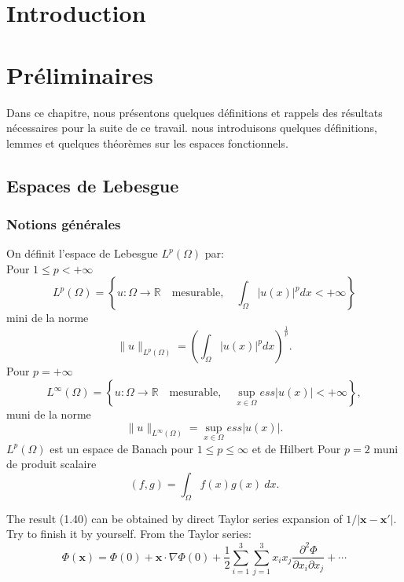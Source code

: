\documentclass[12pt,a4paper]{book}
\begin{document}
\let\cleardoublepage\clearpage
\chapter*{Introduction}
\lipsum[1-3]
\chapter{Préliminaires}
				
Dans ce chapitre, nous présentons quelques définitions et rappels des résultats nécessaires pour la suite de ce travail. nous introduisons quelques définitions, lemmes et  quelques théorèmes sur les espaces fonctionnels.
				
\section{Espaces de Lebesgue}

\subsection{Notions générales}

\begin{definition}{}{} On définit l'espace de Lebesgue $L^{p}(\Omega)$ par:\\	Pour $1\leq p <+\infty$ 
\[
L^{p}(\Omega)=\left\lbrace   u:\Omega\longrightarrow \mathbb{R}\quad \mbox{mesurable} , \quad \int_{\Omega} \lvert u(x)\rvert^{p} dx <+\infty \right\rbrace
\]
	mini de la norme 
	$$ \lVert u\rVert_{L^{p}(\Omega)}=\left(   \int_{\Omega} \lvert u(x)\rvert^{p} dx \right)      ^{\frac{1}{p}}.$$
	Pour $p=+\infty$ 
	$$ L^{\infty}(\Omega)=\left\lbrace u:\Omega\longrightarrow{\mathbb{R}}\quad \mbox{mesurable},\quad \sup\limits_{x\in \Omega} \textit{ess} \lvert u(x) \rvert< +\infty\right\rbrace ,$$
	muni de la norme
	$$  \lVert u\rVert_{L^{\infty}(\Omega)}=\sup\limits_{x\in \Omega}\textit{ess}\lvert u(x) \rvert.$$
	$L^{p}(\Omega)$ est un espace de Banach pour $ 1\leq p \leq \infty $ et de Hilbert Pour $p=2$ muni de produit scalaire
	$$ ( f,g)=\int_{\Omega}f(x)g(x)   ~ dx.$$
\end{definition}

\begin{example*}{}
The result (1.40) can be obtained by direct Taylor series expansion of \(1/\lvert\mathbf{x} - \mathbf{x}'\rvert\). Try to finish it by yourself.
\tcblower
From the Taylor series:
\[
\Phi(\mathbf{x}) = \Phi(0) + \mathbf{x} \cdot \nabla\Phi(0) + \frac{1}{2} \sum_{i=1}^3 \sum_{j=1}^3 x_i x_j \frac{\partial^2\Phi}{\partial x_i \partial x_j} + \cdots
\]
\end{example*}
\end{document}
